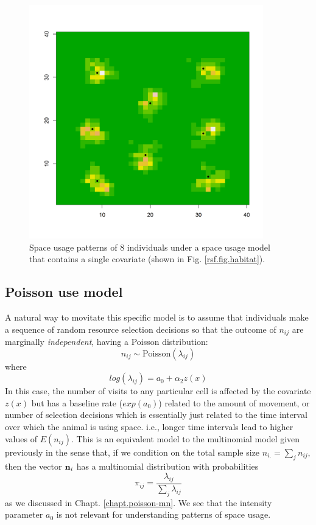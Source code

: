 \begin{figure}[htp]
\centering
\includegraphics[width=4in,height=4in]{Ch10b/figs/homeranges8}
\caption{Space usage patterns of 8 individuals under a space usage
  model that contains a single covariate (shown in
  Fig. \ref{rsf.fig.habitat}).
}
\label{rsf.fig.homeranges}
\end{figure}



\subsection{Poisson use model}

A natural way to movitate this specific model is to
assume that individuals make a sequence of random resource selection
decisions so that the outcome of $n_{ij}$ are marginally {\it
  independent}, having a Poisson distribution:
\[
 n_{ij} \sim \mbox{Poisson}( \lambda_{ij})
\]
where
\[
 log(\lambda_{ij}) = a_{0}  + \alpha_{2} z(x)
\]
In this case,
 the number of visits to any particular cell is affected by
the covariate $z(x)$ but has a baseline rate ($exp(a_{0})$) related to the amount
of movement, or number of selection decisions which is essentially
just related to the time interval over which the animal is using
space. i.e., longer time intervals lead to higher values of
$E(n_{ij})$.
This is an equivalent model to the multinomial model given previously
in the sense that, if we condition on the total sample size $n_{i.} =
\sum_{j} n_{ij}$, then the vector ${\bf n}_{i}$ has a multinomial
distribution with probabilities
\[
 \pi_{ij} = \frac{\lambda_{ij}}{ \sum_{j} \lambda_{ij}}
\]
as we discussed in Chapt. \ref{chapt.poisson-mn}.  We see that the
intensity parameter $a_{0}$ is not relevant for understanding
patterns of space usage.

